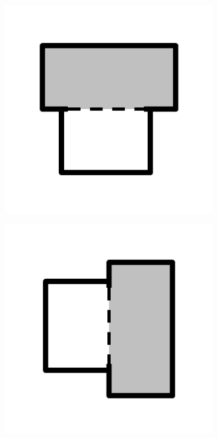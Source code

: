 \documentclass{article}
\begin{document}
\begin{figure}[!h]
\begin{subfigure}{.25\textwidth}
    \caption{}
    \label{fig:c10}
  \end{subfigure}%
  \begin{subfigure}{.25\textwidth}
    \centering
    \includegraphics[width=.95\linewidth]{16cases/c11.png}
    \caption{}
    \label{fig:c11}
  \end{subfigure}%
  \begin{subfigure}{.25\textwidth}
    \centering
    \includegraphics[width=.95\linewidth]{16cases/c12.png}

\end{subfigure}
\end{figure}
\end{document}
